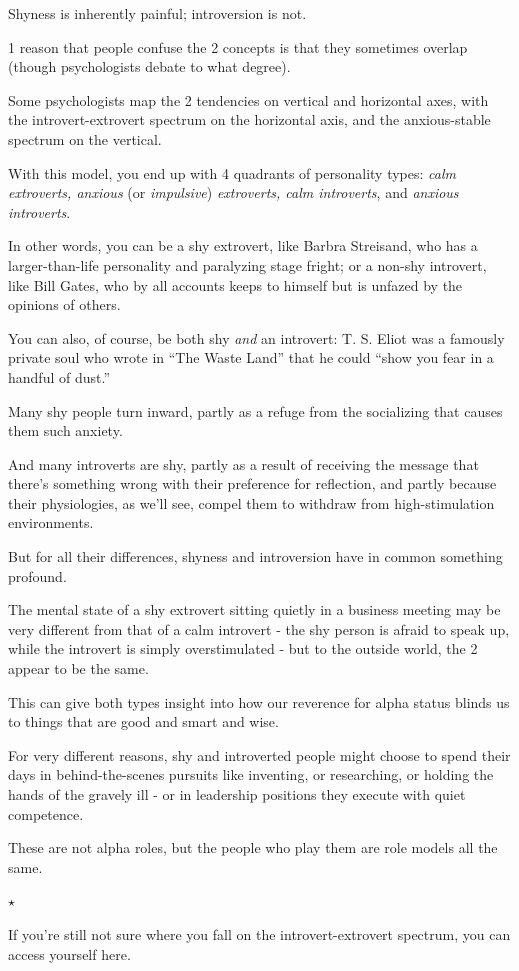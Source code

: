 \documentclass[oneside]{article}
\numberwithin{equation}{section}
\begin{document}
Shyness is inherently painful; introversion is not.

1 reason that people confuse the 2 concepts is that they sometimes overlap (though psychologists debate to what degree).

Some psychologists map the 2 tendencies on vertical and horizontal axes, with the introvert-extrovert spectrum on the horizontal axis, and the anxious-stable spectrum on the vertical.

With this model, you end up with 4 quadrants of personality types: \textit{calm extroverts, anxious} (or \textit{impulsive}) \textit{extroverts, calm introverts}, and \textit{anxious introverts}.

In other words, you can be a shy extrovert, like Barbra Streisand, who has a larger-than-life personality and paralyzing stage fright; or a non-shy introvert, like Bill Gates, who by all accounts keeps to himself but is unfazed by the opinions of others.

%
You can also, of course, be both shy \textit{and} an introvert: T. S. Eliot was a famously private soul who wrote in ``The Waste Land'' that he could ``show you fear in a handful of dust.''

Many shy people turn inward, partly as a refuge from the socializing that causes them such anxiety.

And many introverts are shy, partly as a result of receiving the message that there's something wrong with their preference for reflection, and partly because their physiologies, as we'll see, compel them to withdraw from high-stimulation environments.

%
But for all their differences, shyness and introversion have in common something profound.

The mental state of a shy extrovert sitting quietly in a business meeting may be very different from that of a calm introvert - the shy person is afraid to speak up, while the introvert is simply overstimulated - but to the outside world, the 2 appear to be the same.

This can give both types insight into how our reverence for alpha status blinds us to things that are good and smart and wise.

For very different reasons, shy and introverted people might choose to spend their days in behind-the-scenes pursuits like inventing, or researching, or holding the hands of the gravely ill - or in leadership positions they execute with quiet competence.

These are not alpha roles, but the people who play them are role models all the same.
\begin{center}
    $\star$
\end{center}
If you're still not sure where you fall on the introvert-extrovert spectrum, you can access yourself here.
\end{document}
